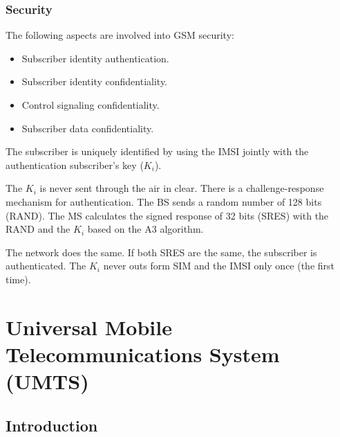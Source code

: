 \documentclass[
	12pt,
	twoside
]{book}
\begin{document}
\subsubsection{Security}

The following aspects are involved into GSM security:
\begin{itemize}
	\item Subscriber identity authentication.
	\item Subscriber identity confidentiality.
	\item Control signaling confidentiality.
	\item Subscriber data confidentiality.
\end{itemize}

The subscriber is uniquely identified by using the IMSI jointly with the authentication subscriber's key ($K_i$).

The $K_i$ is never sent through the air in clear. There is a challenge-response mechanism for authentication. The BS sends a random number of 128 bits (RAND). The MS calculates the signed response of 32 bits (SRES) with the RAND and the $K_i$ based on the A3 algorithm.

The network does the same. If both SRES are the same, the subscriber is authenticated. The $K_i$ never outs form SIM and the IMSI only once (the first time).

\section{Universal Mobile Telecommunications System (UMTS)}

\subsection{Introduction}
\end{document}
